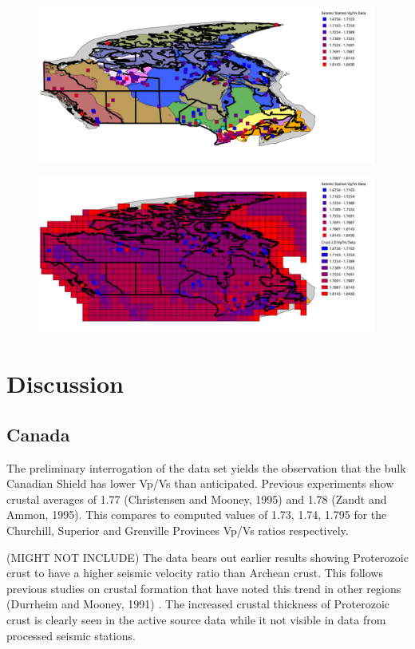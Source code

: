 \documentclass[draft, 12pt]{article}
\begin{document}
\begin{figure}
  \centering
    \includegraphics[width=\textwidth]{VpVsMap}
  \caption{}
  \label{fig:VpVsMap}
\end{figure}

\begin{figure}
  \centering
    \includegraphics[width=\textwidth]{VpVsMapCrust}
  \caption{}
  \label{fig:VpVsMapCrust}
\end{figure}


\section{Discussion}
\subsection{Canada}

  The preliminary interrogation of the data set yields the observation that the bulk Canadian Shield has lower Vp/Vs than anticipated. Previous experiments show crustal averages of 1.77 (Christensen and Mooney, 1995) and 1.78 (Zandt and Ammon, 1995). This compares to computed values of 1.73, 1.74, 1.795 for the Churchill, Superior and Grenville Provinces Vp/Vs ratios respectively.


(MIGHT NOT INCLUDE)  The data bears out earlier results showing Proterozoic crust to have a higher seismic velocity ratio than Archean crust. This follows previous studies on crustal formation that have noted this trend in other regions (Durrheim and Mooney, 1991) . The increased crustal thickness of Proterozoic crust is clearly seen in the active source data while it not visible in data from processed seismic stations.
\end{document}
